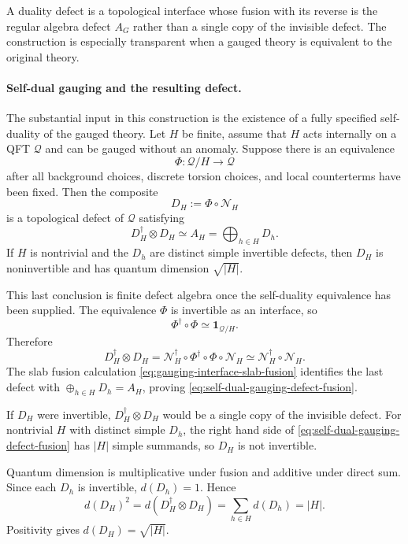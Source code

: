 A duality defect is a topological interface whose fusion with its reverse is
the regular algebra defect \(A_G\) rather than a single copy of the invisible
defect.  The construction is especially transparent when a gauged theory is
equivalent to the original theory.

\paragraph{Self-dual gauging and the resulting defect.}
The substantial input in this construction is the existence of a fully
specified self-duality of the gauged theory.  Let \(H\) be finite, assume that
\(H\) acts internally on a QFT
\(\mathcal Q\) and can be gauged without an anomaly.  Suppose there is an
equivalence
\[
  \Phi:\mathcal Q/H\longrightarrow \mathcal Q
\]
after all background choices, discrete torsion choices, and local
counterterms have been fixed.  Then the composite
\[
  D_H:=\Phi\circ\mathcal N_H
\]
is a topological defect of \(\mathcal Q\) satisfying
\begin{equation}
  D_H^\dagger\otimes D_H
  \simeq
  A_H
  =
  \bigoplus_{h\in H}D_h .
  \label{eq:self-dual-gauging-defect-fusion}
\end{equation}
If \(H\) is nontrivial and the \(D_h\) are distinct simple invertible defects,
then \(D_H\) is noninvertible and has quantum dimension \(\sqrt{|H|}\).

This last conclusion is finite defect algebra once the self-duality equivalence
has been supplied.  The equivalence \(\Phi\) is invertible as an interface, so
\[
  \Phi^\dagger\circ\Phi\simeq\mathbf 1_{\mathcal Q/H}.
\]
Therefore
\[
  D_H^\dagger\otimes D_H
  =
  \mathcal N_H^\dagger\circ\Phi^\dagger\circ\Phi\circ\mathcal N_H
  \simeq
  \mathcal N_H^\dagger\circ\mathcal N_H .
\]
The slab fusion calculation \eqref{eq:gauging-interface-slab-fusion}
identifies the last defect with \(\oplus_{h\in H}D_h=A_H\), proving
\eqref{eq:self-dual-gauging-defect-fusion}.

If \(D_H\) were invertible, \(D_H^\dagger\otimes D_H\) would be a single copy
of the invisible defect.  For nontrivial \(H\) with distinct simple \(D_h\),
the right hand side of \eqref{eq:self-dual-gauging-defect-fusion} has
\(|H|\) simple summands, so \(D_H\) is not invertible.

Quantum dimension is multiplicative under fusion and additive under direct
sum.  Since each \(D_h\) is invertible, \(d(D_h)=1\).  Hence
\[
  d(D_H)^2
  =
  d(D_H^\dagger\otimes D_H)
  =
  \sum_{h\in H}d(D_h)
  =
  |H|.
\]
Positivity gives \(d(D_H)=\sqrt{|H|}\).

